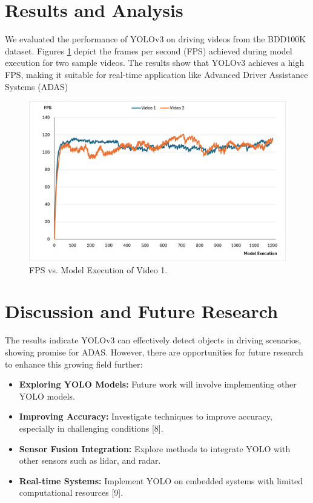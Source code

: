 \documentclass[conference]{IEEEtran}
\begin{document}
\section{Results and Analysis}
We evaluated the performance of YOLOv3 on driving videos from the BDD100K dataset. Figures \ref{fig3}  
depict the frames per second (FPS) achieved during model execution for two sample videos. The results show that 
YOLOv3 achieves a high FPS, making it suitable for real-time application like Advanced Driver Assistance Systems (ADAS)
\begin{figure}[htbp]
\centerline{\includegraphics[scale=.4]{images/Figure 3.png}}
\caption{FPS vs. Model Execution of Video 1.}
\label{fig3}
\end{figure}

\section{Discussion and Future Research}
The results indicate YOLOv3 can effectively detect objects in driving scenarios, showing promise for ADAS. However, 
there are opportunities for future research to enhance this growing field further:
\begin{itemize}
    \item \textbf{Exploring YOLO Models:}
    Future work will involve implementing  other YOLO models.
    \item \textbf{Improving Accuracy:}
    Investigate techniques to improve accuracy, especially in challenging conditions [8].
    \item \textbf{Sensor Fusion Integration:}
    Explore methods to integrate YOLO with other sensors such as lidar, and radar.
    \item \textbf{Real-time Systems:}
    Implement YOLO on embedded systems with limited computational resources [9].
\end{itemize}
\end{document}
